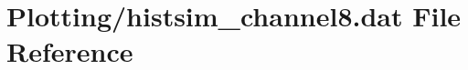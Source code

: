 \hypertarget{Plotting_2histsim__channel8_8dat}{}\section{Plotting/histsim\+\_\+channel8.dat File Reference}
\label{Plotting_2histsim__channel8_8dat}
